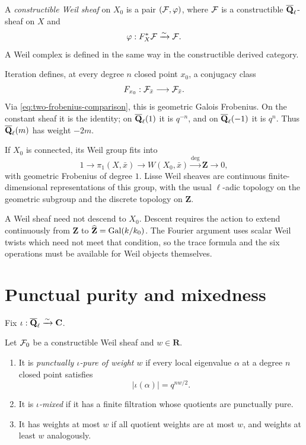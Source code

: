 \begin{definition}
\label{def:weil-sheaf}
A \emph{constructible Weil sheaf} on \(X_0\) is a pair
\((\mathcal F,\varphi)\), where \(\mathcal F\) is a constructible
\(\overline{\mathbf Q}_\ell\)-sheaf on \(X\) and
\[
  \varphi:F_X^*\mathcal F\xrightarrow{\sim}\mathcal F.
\]
A Weil complex is defined in the same way in the constructible derived
category.
\end{definition}

Iteration defines, at every degree \(n\) closed point \(x_0\), a
conjugacy class
\[
 F_{x_0}:\mathcal F_{\bar x}\longrightarrow\mathcal F_{\bar x}.
\]
Via \eqref{eq:two-frobenius-comparison}, this is geometric Galois
Frobenius.  On the constant sheaf it is the identity; on
\(\overline{\mathbf Q}_\ell(1)\) it is \(q^{-n}\), and on \(\overline{\mathbf Q}_\ell(-1)\) it is \(q^n\).
Thus \(\overline{\mathbf Q}_\ell(m)\) has weight \(-2m\).

If \(X_0\) is connected, its Weil group fits into
\[
 1\to\pi_1(X,\bar x)\to W(X_0,\bar x)
 \xrightarrow{\deg}\mathbf Z\to0,
\]
with geometric Frobenius of degree \(1\).  Lisse Weil sheaves are
continuous finite-dimensional representations of this group, with the
usual \(\ell\)-adic topology on the geometric subgroup and the discrete
topology on \(\mathbf Z\).

\begin{warning}
\label{warn:weil-versus-etale}
A Weil sheaf need not descend to \(X_0\).  Descent requires the action
to extend continuously from \(\mathbf Z\) to
\(\widehat{\mathbf Z}=\operatorname{Gal}(k/k_0)\).  The Fourier argument uses scalar
Weil twists which need not meet that condition, so the trace formula
and the six operations must be available for Weil objects themselves.
\end{warning}

\section{Punctual purity and mixedness}

Fix \(\iota:\overline{\mathbf Q}_\ell\xrightarrow{\sim}\mathbf C\).

\begin{definition}
\label{def:iota-purity}
Let \(\mathcal F_0\) be a constructible Weil sheaf and \(w\in\mathbf R\).
\begin{enumerate}
\item It is \emph{punctually \(\iota\)-pure of weight \(w\)} if every
local eigenvalue \(\alpha\) at a degree \(n\) closed point satisfies
\[
 |\iota(\alpha)|=q^{nw/2}.
\]
\item It is \emph{\(\iota\)-mixed} if it has a finite filtration whose
quotients are punctually pure.
\item It has weights at most \(w\) if all quotient weights are at most
\(w\), and weights at least \(w\) analogously.
\end{enumerate}
\end{definition}


